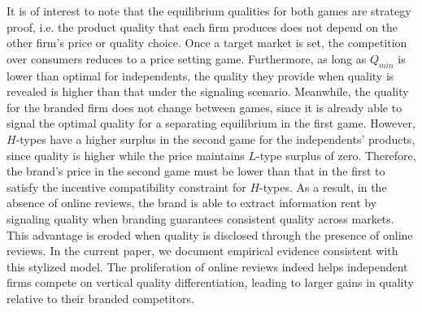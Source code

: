 \documentclass[12pt, leqno]{article}
\begin{document}

It is of interest to note that the equilibrium qualities for both games are strategy proof, i.e. the product quality that each firm produces does not depend on the other firm's price or quality choice. Once a target market is set, the competition over consumers reduces to a price setting game. Furthermore, as long as $Q_{min}$ is lower than optimal for independents, the quality they provide when quality is revealed is higher than that under the signaling scenario. Meanwhile, the quality for the branded firm does not change between games, since it is already able to signal the optimal quality for a separating equilibrium in the first game. However, $H$-types have a higher surplus in the second game for the independents' products, since quality is higher while the price maintains $L$-type surplus of zero. Therefore, the brand's price in the second game must be lower than that in the first to satisfy the incentive compatibility constraint for $H$-types. As a result, in the absence of online reviews, the brand is able to extract information rent by signaling quality when branding guarantees consistent quality across markets. This advantage is eroded when quality is disclosed through the presence of online reviews. In the current paper, we document empirical evidence consistent with this stylized model. The proliferation of online reviews indeed helps independent firms compete on vertical quality differentiation, leading to larger gains in quality relative to their branded competitors.
 
\end{document}
